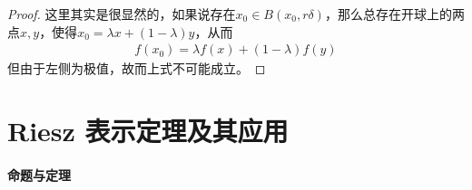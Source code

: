 \begin{enumerate}[leftmargin=2cm, label=\arabic*]
		\begin{proof}
			这里其实是很显然的，如果说存在$x_0\in B(x_0,r\delta)$，那么总存在开球上的两点$x,y$，使得$x_0 = \lambda x+ (1-\lambda) y$，从而
			\begin{align*}
				f(x_0) = \lambda f(x) + (1-\lambda) f(y) 
			\end{align*}
			但由于左侧为极值，故而上式不可能成立。
		\end{proof}
	\end{enumerate}
	
	\section{Riesz 表示定理及其应用}
	\paragraph{命题与定理}
